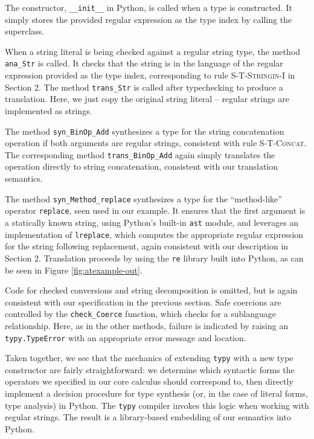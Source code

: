 \documentclass[10pt]{sigplanconf}
\theoremstyle{definition}
\begin{document}
The constructor, \verb|__init__| in Python, is called when a type is constructed. It simply stores the provided regular expression as the type index by calling the superclass.

When a string literal is being checked against a regular string type, the method \verb|ana_Str| is called. It checks that the string is in the language of the regular expression provided as the type index, corresponding to rule \textsc{S-T-Stringin-I} in Section 2. The method \verb|trans_Str| is called after typechecking to produce a translation. Here, we just copy the original string literal -- regular strings are implemented as strings.

The method \verb|syn_BinOp_Add| synthesizes a type for the string concatenation operation if both arguments are regular strings, consistent with rule \textsc{S-T-Concat}. The corresponding method \verb|trans_BinOp_Add| again simply translates the operation directly to string concatenation, consistent with our translation semantics.

The method \verb|syn_Method_replace| synthesizes a type for the ``method-like'' operator \verb|replace|, seen used in our example. It ensures that the first argument is a statically known string, using Python's built-in \verb|ast| module, and leverages an implementation of \verb|lreplace|, which computes the appropriate regular expression for the string following replacement, again consistent with our description in Section 2. Translation proceeds by using the \verb|re| library built into Python, as can be seen in Figure \ref{fig:atexample-out}. 

Code for checked conversions and string decomposition is omitted, but is again consistent with our specification in the previous section. Safe coercions are controlled by the \verb|check_Coerce| function, which checks for a sublanguage relationship. Here, as in the other methods, failure is indicated by raising an \verb|typy.TypeError| with an appropriate error message and location.

Taken together, we see that the mechanics of extending \verb|typy| with a new type constructor are fairly straightforward: we determine which syntactic forms the operators we specified in our core calculus should correspond to, then directly implement a decision procedure for type synthesis (or, in the case of literal forms, type analysis) in Python. The \verb|typy| compiler invokes this logic when working with regular strings. The result is a library-based embedding of our semantics into Python. 
\end{document}
